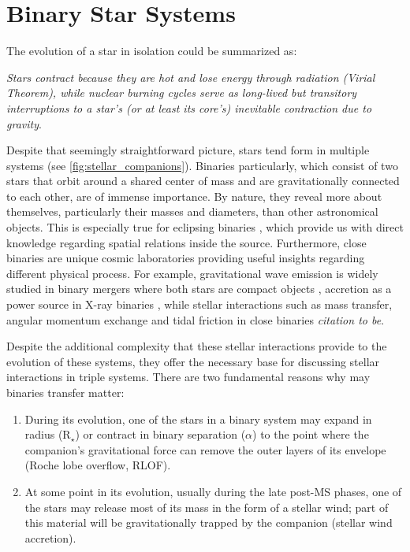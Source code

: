 \section{Binary Star Systems}\label{sec:binary_evolution}

The evolution of a star in isolation could be summarized as:

{\it Stars contract because they are hot and lose energy through radiation (Virial Theorem), while nuclear burning cycles serve as long-lived but transitory interruptions to a star's (or at least its core's) inevitable contraction due to gravity}. 

Despite that seemingly straightforward picture, stars tend form in multiple systems (see \cref{fig:stellar_companions}). Binaries particularly, which consist of two stars that orbit around a shared center of mass and are gravitationally connected to each other, are of immense importance. By nature, they reveal more about themselves, particularly their masses and diameters, than other astronomical objects. This is especially true for eclipsing binaries \citep{prvsa2016physics}, which provide us with direct knowledge regarding spatial relations inside the source. Furthermore, close binaries are unique cosmic laboratories providing useful insights regarding different physical process. For example, gravitational wave emission is widely studied in binary mergers where both stars are compact objects \citep{cutler1994gravitational,abbott2017gw170608,abbott2019gwtc}, accretion as a power source in X-ray binaries \citep{lewin1997x,reig2011x}, while stellar interactions such as mass transfer, angular momentum exchange and tidal friction in close binaries {\it citation to be}. 


Despite the additional complexity that these stellar interactions provide to the evolution of these systems, they offer the necessary base for discussing stellar interactions in triple systems.  There are two fundamental reasons why may binaries transfer matter:

\begin{enumerate}
    \item During its evolution, one of the stars in a binary system may expand in radius (R$_{\star}$) or contract in binary separation (${\alpha}$) to the point where the companion's gravitational force can remove the outer layers of its envelope (Roche lobe overflow, RLOF).
    \item At some point in its evolution, usually during the late post-MS phases, one of the stars may release most of its mass in the form of a stellar wind; part of this material will be gravitationally trapped by the companion (stellar wind accretion). 
\end{enumerate}

